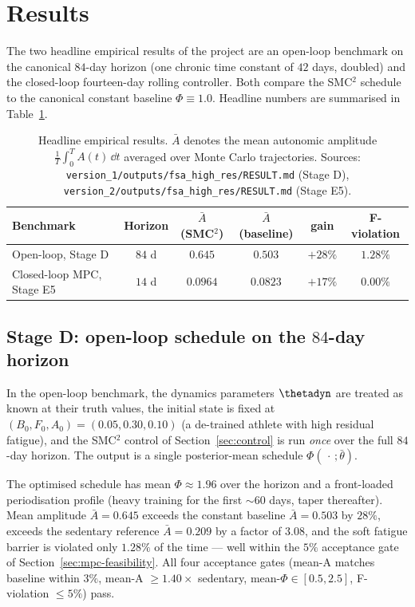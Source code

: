 \section{Results}\label{sec:results}

The two headline empirical results of the project are an open-loop
benchmark on the canonical $84$-day horizon (one chronic time
constant of $42$ days, doubled) and the closed-loop fourteen-day
rolling controller. Both compare the SMC${}^2$ schedule to the
canonical constant baseline $\Phi \equiv 1.0$. Headline numbers are
summarised in Table~\ref{tab:results}.

\begin{table}[h]
\centering
\small
\begin{tabular}{@{}lccccc@{}}
\toprule
Benchmark & Horizon & $\bar A$ (SMC${}^2$) & $\bar A$ (baseline) & gain & F-violation \\
\midrule
Open-loop, Stage D     & $84$ d & $0.645$  & $0.503$  & $+28\%$ & $1.28\%$ \\
Closed-loop MPC, Stage E5 & $14$ d & $0.0964$ & $0.0823$ & $+17\%$ & $0.00\%$ \\
\bottomrule
\end{tabular}
\caption{Headline empirical results. $\bar A$ denotes the mean
autonomic amplitude $\frac{1}{T}\int_0^T A(t)\,\dd t$ averaged over
Monte Carlo trajectories. Sources:
\texttt{version\_1/outputs/fsa\_high\_res/RESULT.md} (Stage D),
\texttt{version\_2/outputs/fsa\_high\_res/RESULT.md} (Stage E5).}
\label{tab:results}
\end{table}

\subsection{Stage D: open-loop schedule on the $84$-day horizon}

In the open-loop benchmark, the dynamics parameters $\thetadyn$ are
treated as known at their truth values, the initial state is fixed
at $(B_0,F_0,A_0) = (0.05,0.30,0.10)$ (a de-trained athlete with
high residual fatigue), and the SMC${}^2$ control of
Section~\ref{sec:control} is run \emph{once} over the full $84$-day
horizon. The output is a single posterior-mean schedule
$\Phi(\,\cdot\,;\bar\theta)$.

The optimised schedule has mean $\Phi \approx 1.96$ over the horizon
and a front-loaded periodisation profile (heavy training for the
first $\sim 60$ days, taper thereafter). Mean amplitude
$\bar A = 0.645$ exceeds the constant baseline $\bar A = 0.503$ by
$28\%$, exceeds the sedentary reference $\bar A = 0.209$ by a factor
of $3.08$, and the soft fatigue barrier is violated only $1.28\%$
of the time --- well within the $5\%$ acceptance gate of
Section~\ref{sec:mpc-feasibility}. All four acceptance gates
(mean-A matches baseline within $3\%$, mean-A $\ge 1.40\times$
sedentary, mean-$\Phi \in [0.5,2.5]$, F-violation $\le 5\%$) pass.

